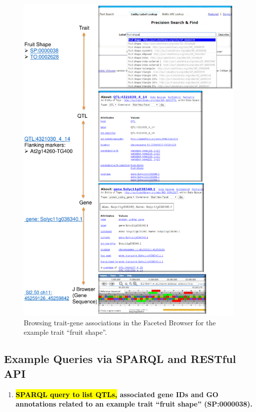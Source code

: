 \documentclass[applsci,article,accept,moreauthors,pdftex]{Definitions/mdpi}
\begin{document}
{\begin{figure}[H]
\centering
\includegraphics[width=\textwidth]{Figure2.pdf}
\caption{Browsing trait-gene associations in the Faceted Browser for the example trait ``fruit shape''.} %
\label{Figure2}
\end{figure}

\newpage


\subsection{Example Queries via SPARQL and RESTful API} %
\begin{enumerate}[label=(\Roman*),leftmargin=*,labelsep=0mm]

\item \textbf{\hl{SPARQL query to list QTLs, } %
associated gene IDs and GO annotations related to an example trait ``fruit shape'' (SP:0000038).}


\end{enumerate}}
\end{document}
